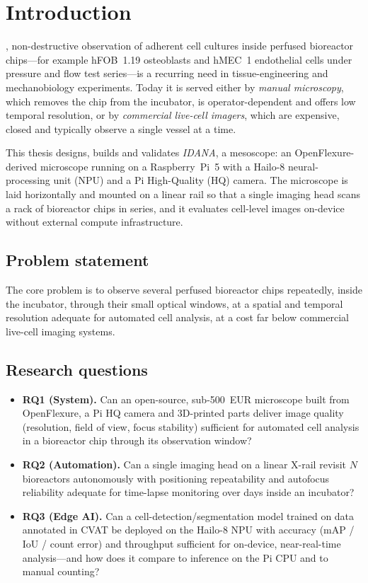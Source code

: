 \section{Introduction}
\label{sec:introduction}

, non-destructive observation of adherent cell
cultures inside perfused bioreactor chips---for example hFOB~1.19 osteoblasts
and hMEC~1 endothelial cells under pressure and flow test series---is a
recurring need in tissue-engineering and mechanobiology experiments. Today it is
served either by \emph{manual microscopy}, which removes the chip from the
incubator, is operator-dependent and offers low temporal resolution, or by
\emph{commercial live-cell imagers}, which are expensive, closed and typically
observe a single vessel at a time.

This thesis designs, builds and validates \emph{IDANA}, a mesoscope: an
OpenFlexure-derived microscope running on a Raspberry~Pi~5 with a Hailo-8
neural-processing unit (NPU) and a Pi High-Quality (HQ) camera. The microscope
is laid horizontally and mounted on a linear rail so that a single imaging head
scans a rack of bioreactor chips in series, and it evaluates cell-level images
on-device without external compute infrastructure.

\subsection{Problem statement}
The core problem is to observe several perfused bioreactor chips repeatedly,
inside the incubator, through their small optical windows, at a spatial and
temporal resolution adequate for automated cell analysis, at a cost far below
commercial live-cell imaging systems.

\subsection{Research questions}
\begin{itemize}
\item \textbf{RQ1 (System).} Can an open-source, sub-\num{500}~EUR
  microscope built from OpenFlexure, a Pi HQ camera and 3D-printed parts deliver
  image quality (resolution, field of view, focus stability) sufficient for
  automated cell analysis in a bioreactor chip through its observation window?
\item \textbf{RQ2 (Automation).} Can a single imaging head on a linear X-rail
  revisit $N$ bioreactors autonomously with positioning repeatability and
  autofocus reliability adequate for time-lapse monitoring over days inside an
  incubator?
\item \textbf{RQ3 (Edge AI).} Can a cell-detection/segmentation model trained on
  data annotated in CVAT be deployed on the Hailo-8 NPU with accuracy
  (mAP / IoU / count error) and throughput sufficient for on-device,
  near-real-time analysis---and how does it compare to inference on the Pi CPU
  and to manual counting?
\end{itemize}

